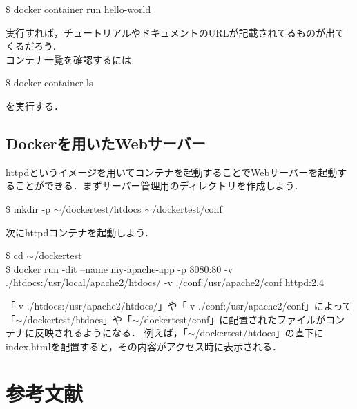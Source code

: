\documentclass[dvipdfmx,a4paper,11pt]{jsbook}
\begin{document}
\begin{tcolorbox}[terminalbox]
  \$ docker container run hello-world
\end{tcolorbox}
実行すれば，チュートリアルやドキュメントのURLが記載されてるものが出てくるだろう．\\
コンテナ一覧を確認するには
\begin{tcolorbox}[terminalbox]
  \$ docker container ls
\end{tcolorbox}
を実行する．

\section{Dockerを用いたWebサーバー}
httpdというイメージを用いてコンテナを起動することでWebサーバーを起動することができる．まずサーバー管理用のディレクトリを作成しよう．
\begin{tcolorbox}[terminalbox]
  \$ mkdir -p $\sim$/dockertest/htdocs $\sim$/dockertest/conf
\end{tcolorbox}
次にhttpdコンテナを起動しよう．
\begin{tcolorbox}[terminalbox]
  \$ cd $\sim$/dockertest\\
  \$ docker run -dit --name my-apache-app -p 8080:80 -v ./htdocs:/usr/local/apache2/htdocs/ -v ./conf:/usr/apache2/conf httpd:2.4
\end{tcolorbox}
「-v ./htdocs:/usr/apache2/htdocs/」や「-v ./conf:/usr/apache2/conf」によって
「$\sim$/dockertest/htdocs」や「$\sim$/dockertest/conf」に配置されたファイルがコンテナに反映されるようになる．
例えば，「$\sim$/dockertest/htdocs」の直下にindex.htmlを配置すると，その内容がアクセス時に表示される．




\chapter{参考文献}
\end{document}
